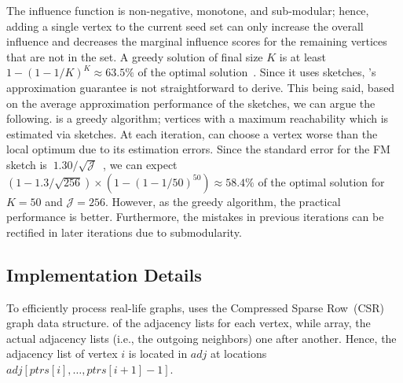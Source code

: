 The influence function is non-negative, monotone, and sub-modular; hence, adding a single vertex to the current seed set can only increase the overall influence and decreases the marginal influence scores for the remaining vertices that are not in the set. A greedy solution of final size $K$ is at least $1-(1-1/K)^K \approx 63.5\%$ of the optimal solution~\cite{nemhauser1978analysis}. Since it uses sketches, \acro's approximation guarantee is not straightforward to derive. This being said, based on the average approximation performance of the sketches, we can argue the following. \acro is a greedy algorithm; vertices with a maximum reachability which is estimated via sketches. At each iteration, \acro can choose a vertex worse than the local optimum due to its estimation errors. Since the standard error for the FM sketch is $~1.30/\sqrt{\mathcal{J}}$~\cite{durand2003loglog}, we can expect $(1-1.3/\sqrt{256}) \times (1-(1-1/50)^{50}) \approx 58.4\%$ of the optimal solution for $K = 50$ and $\mathcal{J} = 256$. However, as the greedy algorithm, the practical performance is better. Furthermore, the mistakes in previous iterations can be rectified in later iterations due to submodularity.

\subsection{Implementation Details}


To efficiently process real-life graphs, \acro uses the Compressed Sparse Row~(CSR) graph data structure. of the adjacency lists for each vertex, while  array,  the actual adjacency lists (i.e., the outgoing neighbors) one after another. Hence, the adjacency list of vertex $i$ is located in $adj$ at locations $adj[ptrs[i], \ldots, ptrs[i+1] - 1]$. 
    

